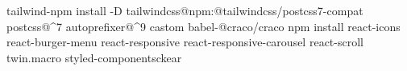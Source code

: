 tailwind-npm install -D tailwindcss@npm:@tailwindcss/postcss7-compat postcss@^7 autoprefixer@^9
castom babel-@craco/craco
npm install react-icons
            react-burger-menu 
            react-responsive
            react-responsive-carousel 
            react-scroll
            twin.macro  
            styled-componentsckear
            